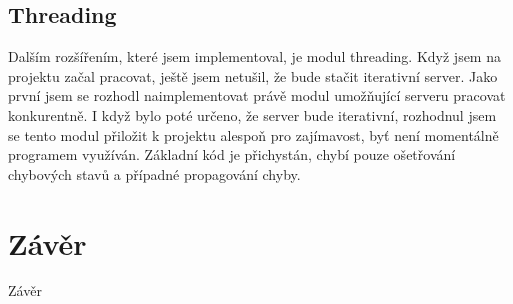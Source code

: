 \documentclass[12pt,a4paper]{report}
\begin{document}
\section{Threading}
Dalším rozšířením, které jsem implementoval, je modul threading. Když jsem na projektu začal pracovat, ještě jsem netušil, že bude stačit iterativní server. Jako první jsem se rozhodl naimplementovat právě modul umožňující serveru pracovat konkurentně. I když bylo poté určeno, že server bude iterativní, rozhodnul jsem se tento modul přiložit k projektu alespoň pro zajímavost, byť není momentálně programem využíván. Základní kód je přichystán, chybí pouze ošetřování chybových stavů a případné propagování chyby. 
\chapter{Závěr}
Závěr
\end{document}
